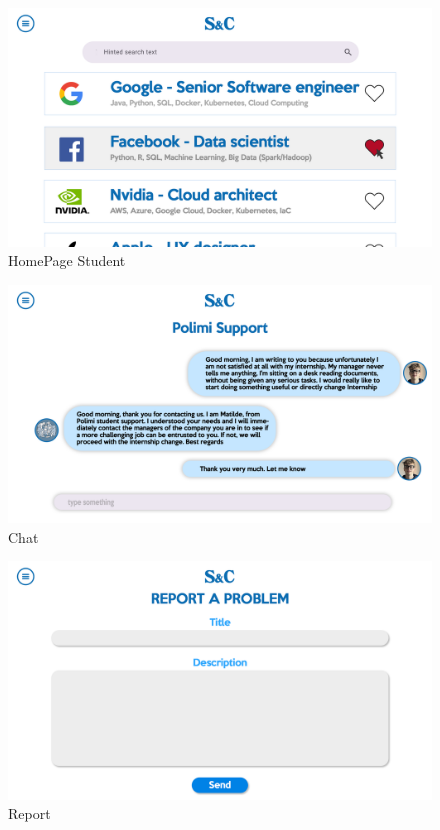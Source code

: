 \begin{figure}[H]
    \centering
    \includegraphics[width=\textwidth]{../images/Homepage_student.png}
    \caption{HomePage Student}
    \label{fig:HomePage Student}
\end{figure}
\begin{figure}[H]
    \centering
    \includegraphics[width=\textwidth]{../images/Chat.png}
    \caption{Chat}
    \label{fig:Chat}
\end{figure}
\begin{figure}[H]
    \centering
    \includegraphics[width=\textwidth]{../images/Report.png}
    \caption{Report}
    \label{fig:Report}
\end{figure}


